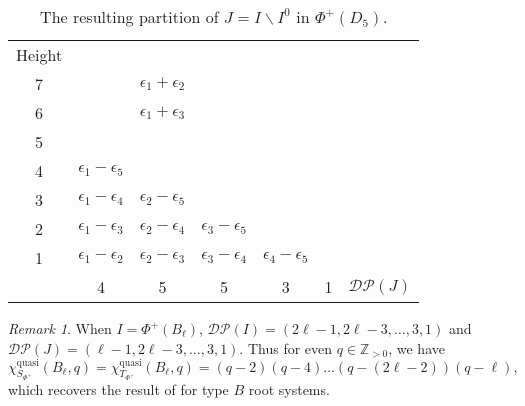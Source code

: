 \documentclass[12pt]{amsart}
\theoremstyle{plain}
\theoremstyle{definition}
\theoremstyle{remark}
\newtheorem{remark}[theorem]{Remark}
\newcommand{\Z}{\mathbb{Z}}
\newcommand{\quasi}{\operatorname{quasi}}
\newcommand{\DP}{{\mathcal{DP}}}
\begin{document}
\begin{table}[htbp]
\centering
{\footnotesize\renewcommand{} 
\begin{tabular}{ccccccc}
\mbox{Height} & & & & &\\
7&   & $\epsilon_1+\epsilon_2$   &  & && \\
6&  & $\epsilon_1+\epsilon_3$    & & &&\\
\hhline{~~--}
5 & & \multicolumn{1}{|c}{\cellcolor{blue!25}{$\epsilon_1+\epsilon_4$}} & \multicolumn{1}{c|}{\cellcolor{blue!25}{$\epsilon_2+\epsilon_3$}}   && \\
\cline{2-2}
4& \multicolumn{1}{|c}{\cellcolor{yellow!25}$\epsilon_1-\epsilon_5$} &  \cellcolor{blue!25}{$\epsilon_1+\epsilon_5$}  & \multicolumn{1}{c|}{\cellcolor{blue!25}{$\epsilon_2+\epsilon_4$}} &&&\\
\cline{5-5}
3 & \multicolumn{1}{|c}{\cellcolor{yellow!25}$\epsilon_1-\epsilon_4$} & \cellcolor{yellow!25}$\epsilon_2-\epsilon_5$  &  \cellcolor{blue!25}{$\epsilon_2+\epsilon_5$} &\multicolumn{1}{c|}{\cellcolor{blue!25}{$\epsilon_3 +\epsilon_4$}}  &&\\
2& \multicolumn{1}{|c}{\cellcolor{yellow!25}$\epsilon_1-\epsilon_3$} & \cellcolor{yellow!25}$\epsilon_2-\epsilon_4$ &  \cellcolor{yellow!25}$\epsilon_3-\epsilon_5$  &\multicolumn{1}{c|}{\cellcolor{blue!25}{$\epsilon_3 +\epsilon_5$}}&& \\
\cline{6-6}
1 & \multicolumn{1}{|c}{\cellcolor{yellow!25}$\epsilon_1-\epsilon_2$} & \cellcolor{yellow!25}$\epsilon_2 -\epsilon_3$& \cellcolor{yellow!25}$\epsilon_3-\epsilon_4$  &  \cellcolor{yellow!25}$\epsilon_4-\epsilon_5$ & \multicolumn{1}{c|}{\cellcolor{blue!25}{$\epsilon_4+\epsilon_5$}} &\\
\cline{2-6}
& 4 & 5 & 5 & 3  & 1 & $\DP(J)$
\end{tabular}
}
\bigskip
\caption{The resulting partition of $J=I \smallsetminus I^{0}$ in $\Phi^+(D_5)$.}
\label{tab:D5-partition-J}
\end{table}

\begin{remark}
\label{rem:B-recover}
When $I=\Phi^+(B_\ell)$, $\DP(I)=(2\ell-1,2\ell-3,\ldots,3,1)$ and $\DP(J)=(\ell-1,2\ell-3,\ldots,3,1)$. 
Thus for even $q \in \Z_{>0}$, we have
   \begin{equation*} 
\chi^{\quasi}_{S_{\Phi^+}}(B_\ell, q)=\chi^{\quasi}_{T_{\Phi^+}}(B_\ell, q)=(q-2)(q-4)\ldots(q-(2\ell-2))(q-\ell),
\end{equation*}
which recovers the result of \cite[Theorem 4.8]{KTT07} for type $B$ root systems.
 \end{remark}
\end{document}
